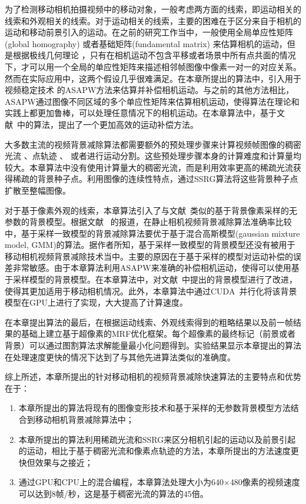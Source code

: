 为了检测移动相机拍摄视频中的移动对象，一般考虑两方面的线索，即运动相关的线索和外观相关的线索。对于运动相关的线索，主要的困难在于区分来自于相机的运动和移动前景引入的运动。在之前的研究工作当中，一般使用全局单应性矩阵(global homography)\cite{5.8s,LiuCVPR09} 或者基础矩阵(fundamental matrix) \cite{kwak2011Generalized,LimPRFloating}来估算相机的运动，但是根据极线几何理论 \cite{Multitransform}，只有在相机运动不包含平移或者场景中所有点共面的情况下，才可以用一个全局的单应性矩阵来描述相邻帧图像中像素一对一的对应关系。然而在实际应用中，这两个假设几乎很难满足。在本章所提出的算法中，引入用于视频稳定技术\cite{Liu2009ASAP,Liu_2013ASAP} 的ASAPW方法来估算并补偿相机运动。与之前的其他方法相比，ASAPW通过图像不同区域的多个单应性矩阵来估算相机运动，使得算法在理论和实践上都更加鲁棒，可以处理任意情况下的相机运动。在本章算法中，基于文献~中的算法，提出了一个更加高效的运动补偿方法。\par

大多数主流的视频背景减除算法都需要额外的预处理步骤来计算视频帧图像的稠密光流 \cite{Multitransform,gbsuperpixel}、点轨迹 \cite{iccv2009,Cui2012,SubspaceTracking}、 或者进行运动分割\cite{kwak2011Generalized}。这些预处理步骤本身的计算难度和计算量均较大。本章算法中没有使用计算量大的稠密光流，而是利用效率更高的稀疏光流获得稀疏的背景种子点。利用图像的连续性特点，通过SSRG算法将这些背景种子点扩散至整幅图像。\par

对于基于像素外观的线索，本章算法引入了与文献~类似的基于背景像素采样的无参数的背景模型。根据文献
 ~的报道，在静止相机视频背景减除算法准确率比较中，基于采样一致模型的背景减除算法要优于基于混合高斯模型(gaussian mixture model, GMM)的算法。据作者所知，基于采样一致模型的背景模型还没有被用于移动相机视频背景减除技术当中。主要的原因在于基于采样的模型对运动补偿的误差非常敏感。由于本章算法利用ASAPW来准确的补偿相机运动，使得可以使用基于采样模型的背景模型。在本章算法中，对文献~中提出的背景模型进行了改进，使得其更加适用于移动相机情况。此外，本章算法中通过CUDA~\cite{CUDA}并行化将该背景模型在GPU上进行了实现，大大提高了计算速度。\par

 在本章提出算法的最后，在根据运动线索、外观线索得到的粗略结果以及前一帧结果的基础上建立基于超像素的MRF优化框架。每个超像素的最终标记（前景或者背景）可以通过图割算法\cite{graphcut04}求解能量最小化问题得到。实验结果显示本章提出的算法在处理速度更快的情况下达到了与其他先进算法类似的准确度。


综上所述，本章所提出的针对移动相机的视频背景减除快速算法的主要特点和优势在于：
\begin{enumerate}
\item 本章所提出的算法将现有的图像变形技术和基于采样的无参数背景模型方法结合到移动相机背景减除算法中；
\item 本章所提出的算法利用稀疏光流和SSRG来区分相机引起的运动以及前景引起的运动，相比于基于稠密光流和像素点轨迹的方法，本章所提出的方法速度更快但效果与之接近；
\item 通过GPU和CPU上的混合编程，本章算法处理大小为640$\times$480像素的视频速度可以达到8帧/秒，这是基于稠密光流的算法\cite{gbsuperpixel}的45倍。
\end{enumerate}



